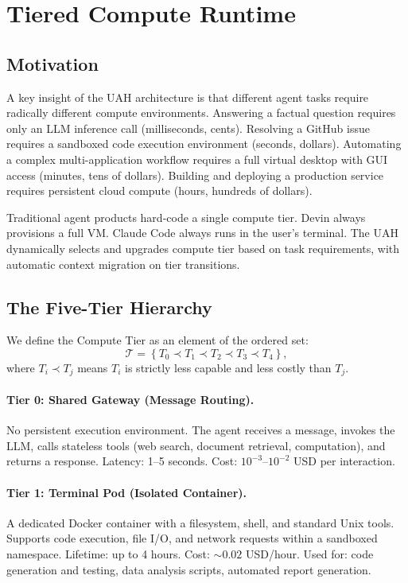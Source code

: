 \section{Tiered Compute Runtime}

\label{sec:tiers}

\subsection{Motivation}

A key insight of the UAH architecture is that different agent tasks require
radically different compute environments. Answering a factual question requires
only an LLM inference call (milliseconds, cents). Resolving a GitHub issue
requires a sandboxed code execution environment (seconds, dollars). Automating
a complex multi-application workflow requires a full virtual desktop with GUI
access (minutes, tens of dollars). Building and deploying a production service
requires persistent cloud compute (hours, hundreds of dollars).

Traditional agent products hard-code a single compute tier. Devin always
provisions a full VM. Claude Code always runs in the user's terminal. The UAH
dynamically selects and upgrades compute tier based on task requirements,
with automatic context migration on tier transitions.

\subsection{The Five-Tier Hierarchy}

We define the Compute Tier as an element of the ordered set:
\begin{equation}
    \mathcal{T} = \left\{T_0 \prec T_1 \prec T_2 \prec T_3 \prec T_4\right\},
\end{equation}
where $T_i \prec T_j$ means $T_i$ is strictly less capable and less costly
than $T_j$.

\paragraph{Tier 0: Shared Gateway (Message Routing).}
No persistent execution environment. The agent receives a message, invokes
the LLM, calls stateless tools (web search, document retrieval, computation),
and returns a response. Latency: 1--5 seconds. Cost: $10^{-3}$--$10^{-2}$
USD per interaction.

\paragraph{Tier 1: Terminal Pod (Isolated Container).}
A dedicated Docker container with a filesystem, shell, and standard
Unix tools. Supports code execution, file I/O, and network requests within
a sandboxed namespace. Lifetime: up to 4 hours. Cost: $\sim 0.02$ USD/hour.
Used for: code generation and testing, data analysis scripts, automated
report generation.

